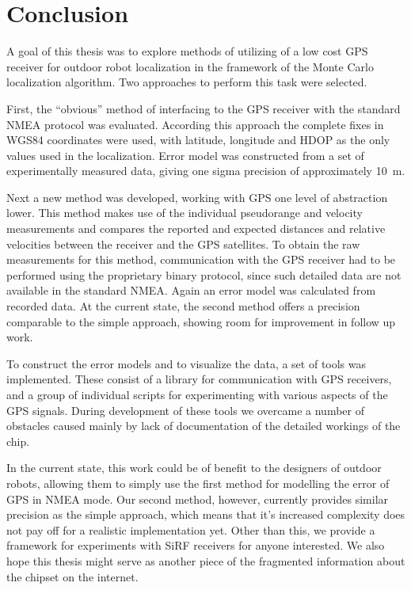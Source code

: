 \chapter{Conclusion}
\label{chap:conclusion}

A goal of this thesis was to explore methods of utilizing of a low cost GPS receiver
for outdoor robot localization in the framework of the Monte Carlo localization algorithm.
Two approaches to perform this task were selected.

First, the \enquote{obvious} method of interfacing to the GPS receiver with the
standard NMEA protocol was evaluated.
According this approach the complete fixes in WGS84 coordinates were used,
with latitude, longitude and HDOP as the only values used in the localization.
Error model was constructed from a set of experimentally measured data,
giving one sigma precision of approximately \SI{10}{\meter}.

Next a new method was developed, working with GPS one level of abstraction lower.
This method makes use of the individual pseudorange and velocity measurements
and compares the reported and expected distances and relative velocities between
the receiver and the GPS satellites.
To obtain the raw measurements for this method, communication with the GPS
receiver had to be performed using the proprietary binary protocol,
since such detailed data are not available in the standard NMEA.
Again an error model was calculated from recorded data.
At the current state, the second method offers a precision comparable to the simple
approach, showing room for improvement in follow up work.

To construct the error models and to visualize the data, a set of tools was implemented.
These consist of a library for communication with \sirf GPS receivers,
and a group of individual scripts for experimenting with various aspects of the GPS signals.
During development of these tools we overcame a number of obstacles caused mainly
by lack of documentation of the detailed workings of the \sirf chip.

In the current state, this work could be of benefit to the designers of
outdoor robots, allowing them to simply use the first method for modelling the
error of GPS in NMEA mode.
Our second method, however, currently provides similar precision as the simple
approach, which means that it's increased complexity does not pay off for a realistic
implementation yet.
Other than this, we provide a framework for experiments with SiRF receivers
for anyone interested.
We also hope this thesis might serve as another piece of the fragmented
information about the \sirf chipset on the internet.
